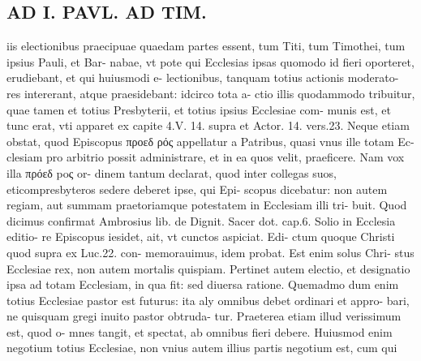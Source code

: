 \documentclass{article}
\begin{document}
\begin{pages}
\section*{AD I. PAVL. AD TIM. }
\marginpar{[ p.043 ]}\pstart iis electionibus praecipuae quaedam partes essent, tum Titi, tum Timothei, tum ipsius Pauli, et Bar- nabae, vt pote qui Ecclesias ipsas quomodo id fieri oporteret, erudiebant, et qui huiusmodi e- lectionibus, tanquam totius actionis moderato- res intererant, atque praesidebant: idcirco tota a- ctio illis quodammodo tribuitur, quae tamen et totius Presbyterii, et totius ipsius Ecclesiae com- munis est, et tunc erat, vti apparet ex capite 4.V. 14. supra et Actor. 14. vers.23. Neque etiam obstat, quod Episcopus προεδ ρός appellatur a Patribus, quasi vnus ille totam Ec- clesiam pro arbitrio possit administrare, et in ea quos velit, praeficere. Nam vox illa πρόεδ poς or- dinem tantum declarat, quod inter collegas suos, eticompresbyteros sedere deberet ipse, qui Epi- scopus dicebatur: non autem regiam, aut summam praetoriamque potestatem in Ecclesiam illi tri- buit. Quod dicimus confirmat Ambrosius lib.  de Dignit. Sacer dot. cap.6. Solio in Ecclesia editio- re Episcopus iesidet, ait, vt cunctos aspiciat. Edi- ctum quoque Christi quod supra ex Luc.22. con- memorauimus, idem probat. Est enim solus Chri- stus Ecclesiae rex, non autem mortalis quispiam. Pertinet autem electio, et designatio ipsa ad totam Ecclesiam, in qua fit: sed diuersa ratione. Quemadmo dum enim totius Ecclesiae pastor est futurus: ita aly omnibus debet ordinari et appro- bari, ne quisquam gregi inuito pastor obtruda- tur. Praeterea etiam illud verissimum est, quod o- mnes tangit, et spectat, ab omnibus fieri debere. Huiusmod enim negotium totius Ecclesiae, non vnius autem illius partis negotium est, cum qui  \pend

\end{pages}
\end{document}
